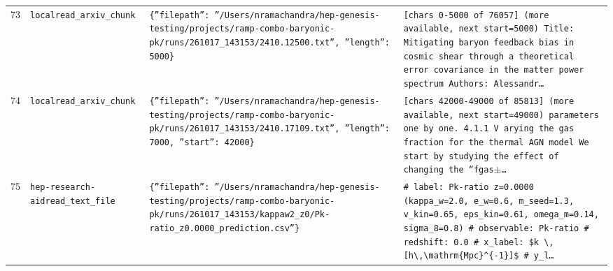 \documentclass[11pt,a4paper]{article}
\begin{document}
\begin{longtable}{@{}p{}p{}p{}p{}@{}}
73 & \texttt{local}\newline\texttt{read\_\allowbreak{}arxiv\_\allowbreak{}chunk} & \texttt{\{''filepath'':\allowbreak{} ''/\allowbreak{}Users/\allowbreak{}nramachandra/\allowbreak{}hep-genesis-testing/\allowbreak{}projects/\allowbreak{}ramp-combo-baryonic-pk/\allowbreak{}runs/\allowbreak{}261017\_\allowbreak{}143153/\allowbreak{}2410.12500.txt'',\allowbreak{} ''length'':\allowbreak{} 5000\}\allowbreak{}} & \texttt{[chars 0-5000 of 76057]\allowbreak{} (more available,\allowbreak{} next start=\allowbreak{}5000)\allowbreak{}  Title:\allowbreak{} Mitigating baryon feedback bias in cosmic shear through a theoretical error covariance in the matter power spectrum Authors:\allowbreak{} Alessandr\ldots{}\allowbreak{}} \\
74 & \texttt{local}\newline\texttt{read\_\allowbreak{}arxiv\_\allowbreak{}chunk} & \texttt{\{''filepath'':\allowbreak{} ''/\allowbreak{}Users/\allowbreak{}nramachandra/\allowbreak{}hep-genesis-testing/\allowbreak{}projects/\allowbreak{}ramp-combo-baryonic-pk/\allowbreak{}runs/\allowbreak{}261017\_\allowbreak{}143153/\allowbreak{}2410.17109.txt'',\allowbreak{} ''length'':\allowbreak{} 7000,\allowbreak{} ''start'':\allowbreak{} 42000\}\allowbreak{}} & \texttt{[chars 42000-49000 of 85813]\allowbreak{} (more available,\allowbreak{} next start=\allowbreak{}49000)\allowbreak{}  parameters one by one. 4.1.1 V arying the gas fraction for the thermal AGN model We start by studying the effect of changing the ``fgas$\pm$\ldots{}\allowbreak{}} \\
75 & \texttt{hep-research-aid}\newline\texttt{read\_\allowbreak{}text\_\allowbreak{}file} & \texttt{\{''filepath'':\allowbreak{} ''/\allowbreak{}Users/\allowbreak{}nramachandra/\allowbreak{}hep-genesis-testing/\allowbreak{}projects/\allowbreak{}ramp-combo-baryonic-pk/\allowbreak{}runs/\allowbreak{}261017\_\allowbreak{}143153/\allowbreak{}kappaw2\_\allowbreak{}z0/\allowbreak{}Pk-ratio\_\allowbreak{}z0.0000\_\allowbreak{}prediction.csv''\}\allowbreak{}} & \texttt{\# label:\allowbreak{} Pk-ratio z=\allowbreak{}0.0000 (kappa\_\allowbreak{}w=\allowbreak{}2.0,\allowbreak{} e\_\allowbreak{}w=\allowbreak{}0.6,\allowbreak{} m\_\allowbreak{}seed=\allowbreak{}1.3,\allowbreak{} v\_\allowbreak{}kin=\allowbreak{}0.65,\allowbreak{} eps\_\allowbreak{}kin=\allowbreak{}0.61,\allowbreak{} omega\_\allowbreak{}m=\allowbreak{}0.14,\allowbreak{} sigma\_\allowbreak{}8=\allowbreak{}0.8)\allowbreak{} \# observable:\allowbreak{} Pk-ratio \# redshift:\allowbreak{} 0.0 \# x\_\allowbreak{}label:\allowbreak{} \$k \textbackslash{}\allowbreak{},\allowbreak{} [h\textbackslash{}\allowbreak{},\allowbreak{}\textbackslash{}\allowbreak{}mathrm\{Mpc\}\allowbreak{}\textasciicircum{}\allowbreak{}\{-1\}\allowbreak{}]\allowbreak{}\$ \# y\_\allowbreak{}l\ldots{}\allowbreak{}} \\

\end{longtable}
\end{document}
